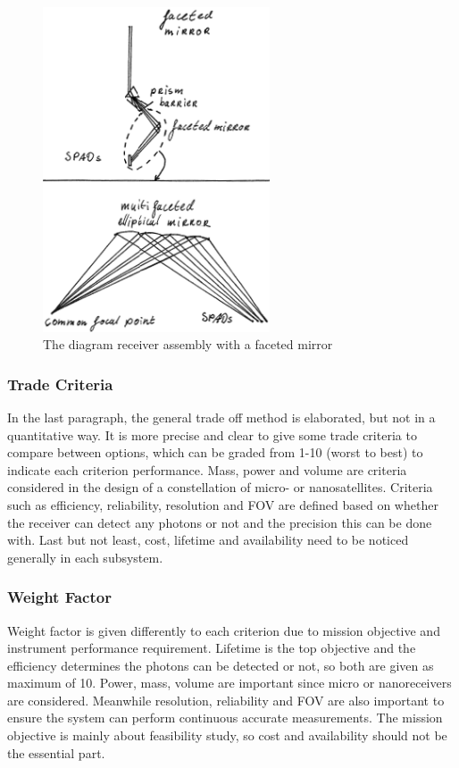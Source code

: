 \begin{figure}[ht!]
\centering
\includegraphics[width=0.6\textwidth]{chapters/img/DiagramReceiverAssemblyFacetedMirror.png}
\caption{The diagram receiver assembly with a faceted mirror}
\label{fig:diagram_Rfaceted mirror}
\end{figure}

\subsubsection{Trade Criteria}
\label{TOReceiverC}
In the last paragraph, the general trade off method is elaborated, but not in a quantitative way. It is more precise and clear to give some trade criteria to compare between options, which can be graded from 1-10 (worst to best) to indicate each criterion performance. Mass, power and volume are criteria considered in the design of a constellation of micro- or nanosatellites. Criteria such as efficiency, reliability, resolution and \ac{FOV} are defined based on whether the receiver can detect any photons or not and the precision this can be done with. Last but not least, cost, lifetime and availability need to be noticed generally in each subsystem.

\subsubsection{Weight Factor}
\label{TOReceiverWF}
Weight factor is given differently to each criterion due to mission objective and instrument performance requirement. Lifetime is the top objective and the efficiency determines the photons can be detected or not, so both are given as maximum of 10. Power, mass, volume are important since micro or nanoreceivers are considered. Meanwhile resolution, reliability and \acs{FOV} are also important to ensure the system can perform continuous accurate measurements. The mission objective is mainly about feasibility study, so cost and availability should not be the essential part.

